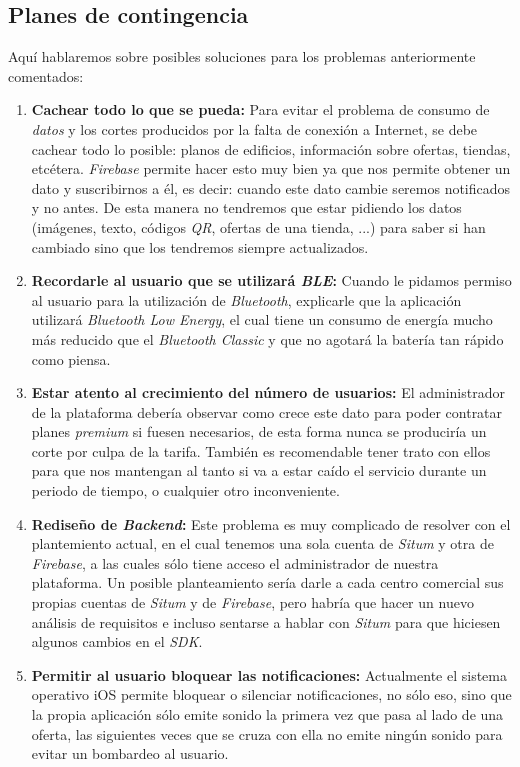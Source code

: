\subsection{Planes de contingencia}
Aquí hablaremos sobre posibles soluciones para los problemas anteriormente comentados:
\begin{enumerate}
\item \textbf{Cachear todo lo que se pueda:} Para evitar el problema de consumo de \textit{datos} y los cortes producidos por la falta de conexión a Internet, se debe cachear todo lo posible: planos de edificios, información sobre ofertas, tiendas, etcétera. \textit{Firebase} permite hacer esto muy bien ya que nos permite obtener un dato y suscribirnos a él, es decir: cuando este dato cambie seremos notificados y no antes. De esta manera no tendremos que estar pidiendo los datos (imágenes, texto, códigos \textit{QR}, ofertas de una tienda, ...) para saber si han cambiado sino que los tendremos siempre actualizados.
\item \textbf{Recordarle al usuario que se utilizará \textit{BLE}:} Cuando le pidamos permiso al usuario para la utilización de \textit{Bluetooth}, explicarle que la aplicación utilizará \textit{Bluetooth Low Energy}, el cual tiene un consumo de energía mucho más reducido que el \textit{Bluetooth Classic} y que no agotará la batería tan rápido como piensa.
\item \textbf{Estar atento al crecimiento del número de usuarios:} El administrador de la plataforma debería observar como crece este dato para poder contratar planes \textit{premium} si fuesen necesarios, de esta forma nunca se produciría un corte por culpa de la tarifa. También es recomendable tener trato con ellos para que nos mantengan al tanto si va a estar caído el servicio durante un periodo de tiempo, o cualquier otro inconveniente.
\item \textbf{Rediseño de \textit{Backend}:} Este problema es muy complicado de resolver con el plantemiento actual, en el cual tenemos una sola cuenta de \textit{Situm} y otra de \textit{Firebase}, a las cuales sólo tiene acceso el administrador de nuestra plataforma. Un posible planteamiento sería darle a cada centro comercial sus propias cuentas de \textit{Situm} y de \textit{Firebase}, pero habría que hacer un nuevo análisis de requisitos e incluso sentarse a hablar con \textit{Situm} para que hiciesen algunos cambios en el \textit{SDK}.
\item \textbf{Permitir al usuario bloquear las notificaciones: } Actualmente el sistema operativo iOS permite bloquear o silenciar notificaciones, no sólo eso, sino que la propia aplicación sólo emite sonido la primera vez que pasa al lado de una oferta, las siguientes veces que se cruza con ella no emite ningún sonido para evitar un bombardeo al usuario.

\end{enumerate}
